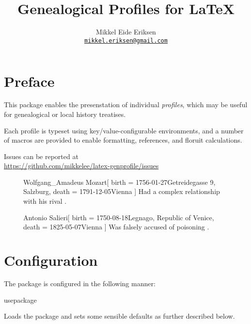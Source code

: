 \documentclass[
	a4paper,
]{article}
\title{Genealogical Profiles for \LaTeX}
\author{Mikkel Eide Eriksen\\%
	\href{mailto:mikkel.eriksen@gmail.com}{\texttt{mikkel.eriksen@gmail.com}}}
\begin{document}
\maketitle

\section{Preface} %

This package enables the presenstation of individual \emph{profiles}, which may be useful for genealogical or local history treatises.

Each profile is typeset using key/value-configurable environments, and a number of macros are provided to enable formatting, references, and floruit calculations.

Issues can be reported at\\\null\hfill\url{https://github.com/mikkelee/latex-genprofile/issues}

\begin{figure}
\begingroup
{}
\begin{gprProfile}{Wolfgang_Amadeus Mozart}[
	birth = {1756-01-27}{Getreidegasse 9, Salzburg},
	death = {1791-12-05}{Vienna}
]
	Had a complex relationship with his rival .
\end{gprProfile}
\begin{gprProfile}{Antonio Salieri}[
	birth = {1750-08-18}{Legnago, Republic of Venice},
	death = {1825-05-07}{Vienna}
]
	Was falsely accused of poisoning .
\end{gprProfile}
\endgroup
\end{figure}

\clearpage
\section{Configuration} %

The package is configured in the following manner:

\begin{docCommand}
	{usepackage}
	{}

	Loads the package and sets some sensible defaults as further described below.

\end{docCommand}
\end{document}
